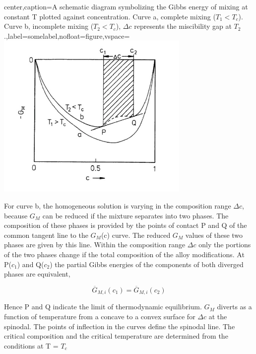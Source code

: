 \documentclass[12pt]{article}
\newcommand*{\1}{\hspace{1pt}}
\begin{document}
    
\begin{adjustbox}{center,caption={A schematic diagram symbolizing the Gibbs energy of mixing at constant T plotted against concentration. 
    Curve a, complete mixing ($ T _1 < T _c $). 
    Curve b, incomplete mixing ($ T _2 < T _c $), 
    $\Delta c$ represents the miscibility gap at $ T _2$ .},label={somelabel},nofloat=figure,vspace=\bigskipamount}
    \includegraphics[width=0.7\textwidth]{fi_1}
\end{adjustbox}
    

    For curve b, the homogeneous solution is varying in the composition range $\Delta c$, because
$G _M$ can be reduced if the mixture separates into two phases. The composition of these phases
is provided by the points of contact P and Q of the common tangent line to the $G _M$(c) curve.
The reduced $G _M$  values of these two phases are given by this line. Within the composition
range $\Delta c$ only the portions of the two phases change if the total composition of the alloy
modifications. At P($c _1$) and Q($c _2$) the partial Gibbs energies of the components of both diverged
phases are equivalent,

    \begin{equation}
        \overline{G} _{M,i}(c _{1}) =  \overline{G} _{M,i}(c _{2})          \tag*{( i= A,B )}
    \end{equation}

    Hence P and Q indicate the limit of thermodynamic equilibrium. $G _M$ diverts as a function of
temperature from a concave to a convex surface for $\Delta c $ at the spinodal. The points of
inflection in the curves define the spinodal line. The critical composition and the critical
temperature are determined from the conditions at T = $T _c$\\
\end{document}
